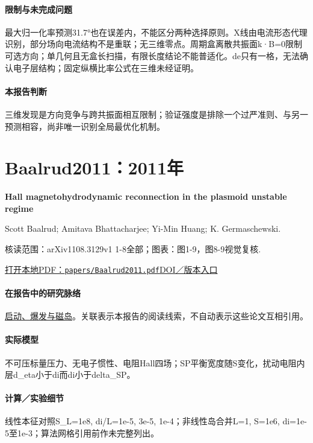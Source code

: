 \paragraph{限制与未完成问题}最大归一化率预测31.7°也在误差内，不能区分两种选择原则。X线由电流形态代理识别，部分场向电流结构不是重联；无三维零点。周期盒离散共振面k·B=0限制可选方向；单几何且无盒长扫描，有限长度结论不能普适化。de只有一格，无法确认电子层结构；固定纵横比率公式在三维未经证明。

\paragraph{本报告判断}三维发现是方向竞争与跨共振面相互限制；验证强度是排除一个过严准则、与另一预测相容，尚非唯一识别全局最优化机制。

\section{Baalrud2011：2011年}\label{paper:Baalrud2011}

\textbf{Hall magnetohydrodynamic reconnection in the plasmoid unstable regime}\citep{Baalrud2011}\

Scott Baalrud;  Amitava Bhattacharjee;  Yi-Min Huang;  K. Germaschewski.

\textsf{核读范围：}arXiv1108.3129v1 1-8全部；\textsf{图表：}图1-9，图8-9视觉复核.

\href{run:papers/Baalrud2011.pdf}{打开本地PDF：\texttt{papers/Baalrud2011.pdf}}\quad\href{https://doi.org/10.1063/1.3633473}{DOI／版本入口}

\paragraph{在报告中的研究脉络}\hyperref[story:onset]{启动、爆发与磁岛}。关联表示本报告的阅读线索，不自动表示这些论文互相引用。

\paragraph{实际模型}不可压标量压力、无电子惯性、电阻Hall四场；SP平衡宽度随S变化，扰动电阻内层d\_eta小于di而di小于delta\_SP。

\paragraph{计算／实验细节}线性本征对照S\_L=1e8, di/L=1e-5, 3e-5, 1e-4；非线性岛合并L=1, S=1e6, di=1e-5至1e-3；算法网格引用前作未完整列出。

